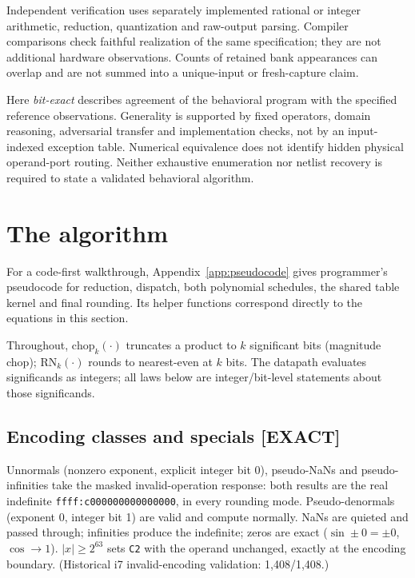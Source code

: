 \documentclass[11pt]{article}
\newcommand{\chop}[1]{\mathrm{chop}_{#1}}   %
\newcommand{\rn}[1]{\mathrm{RN}_{#1}}       %
\newcommand{\hex}[1]{\texttt{#1}}
\begin{document}
Independent verification uses separately implemented rational or integer
arithmetic, reduction, quantization and raw-output parsing. Compiler comparisons
check faithful realization of the same specification; they are not additional
hardware observations. Counts of retained bank appearances can overlap and
are not summed into a unique-input or fresh-capture claim.

Here \emph{bit-exact} describes agreement of the behavioral program with the
specified reference observations. Generality is supported by fixed operators,
domain reasoning, adversarial transfer and implementation checks, not by an
input-indexed exception table. Numerical equivalence does not identify hidden
physical operand-port routing. Neither exhaustive enumeration nor netlist
recovery is required to state a validated behavioral algorithm.

\section{The algorithm}
\label{sec:algorithm}

For a code-first walkthrough, Appendix~\ref{app:pseudocode} gives
programmer's pseudocode for reduction, dispatch, both polynomial schedules,
the shared table kernel and final rounding. Its helper functions correspond
directly to the equations in this section.

Throughout, $\chop{k}(\cdot)$ truncates a product to $k$ significant
bits (magnitude chop); $\rn{k}(\cdot)$ rounds to nearest-even at $k$
bits.  The datapath evaluates significands as integers; all laws below
are integer/bit-level statements about those significands.

\subsection{Encoding classes and specials \textnormal{[EXACT]}}
\label{sec:specials}

Unnormals (nonzero exponent, explicit integer bit 0), pseudo-NaNs and
pseudo-infinities take the masked invalid-operation response: both
results are the real indefinite \hex{ffff:c000000000000000}, in every
rounding mode.  Pseudo-denormals (exponent 0, integer bit 1) are valid
and compute normally.  NaNs are quieted and passed through;
infinities produce the indefinite; zeros are exact ($\sin\pm0 =
\pm0$, $\cos\to 1$).  $|x| \ge 2^{63}$ sets \texttt{C2} with the
operand unchanged, exactly at the encoding boundary. (Historical i7
invalid-encoding validation: 1{,}408/1{,}408.)
\end{document}
